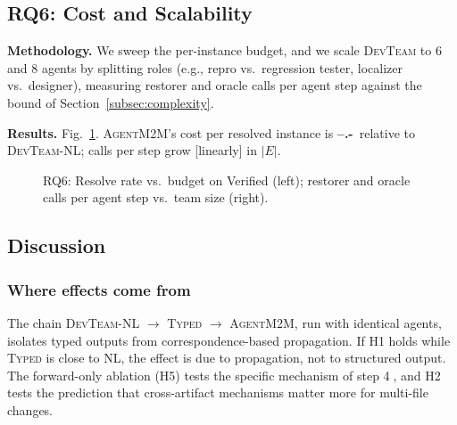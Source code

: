\documentclass[10pt, anonymous, conference]{IEEEtran}
\theoremstyle{definition}
\theoremstyle{plain}
\theoremstyle{remark}
\newcommand{\tool}{\textsc{AgentM2M}}
\newcommand{\devteam}{\textsc{DevTeam}}
\newcommand{\step}[1]{\textcircled{\scriptsize #1}}
\newcommand{\ph}{{\color{red}\textbf{--.-}}}     %
\newcommand{\hyp}[1]{{\color{blue}#1}}           %
\newif\ifplaceholderdata \placeholderdatatrue     %
\newcommand{\phwatermark}{\ifplaceholderdata
  \node[red, opacity=0.55, font=\bfseries\scriptsize, rotate=12]
  at (rel axis cs:0.5,0.55) {PLACEHOLDER DATA};\fi}
\begin{document}
\subsection{RQ6: Cost and Scalability}\label{subsec:rq6}
\noindent\textbf{Methodology.} We sweep the per-instance budget, and we scale
\devteam{} to 6 and 8 agents by splitting roles (e.g., repro vs.\ regression
tester, localizer vs.\ designer), measuring restorer and oracle calls per agent
step against the bound of Section~\ref{subsec:complexity}.

\noindent\textbf{Results.} Fig.~\ref{fig:cost}. \hyp{\tool{}'s cost per
resolved instance is \ph\ relative to \textsc{DevTeam-NL}; calls per step grow
[linearly] in $|E|$.}

\begin{figure}[t]
\centering
{}
\caption{RQ6: Resolve rate vs.\ budget on Verified (left); restorer and oracle
calls per agent step vs.\ team size (right).}
\label{fig:cost}
\end{figure}

\subsection{Discussion}\label{subsec:discussion}

\subsubsection{Where effects come from}
The chain \textsc{DevTeam-NL} $\to$ \textsc{Typed} $\to$ \tool{}, run with
identical agents, isolates typed outputs from correspondence-based
propagation. \hyp{If H1 holds while \textsc{Typed} is close to
\textsc{NL}, the effect is due to propagation, not to structured output.} The
forward-only ablation (H5) tests the specific mechanism of step \step{4}, and
H2 tests the prediction that cross-artifact mechanisms matter more for
multi-file changes.
\end{document}
